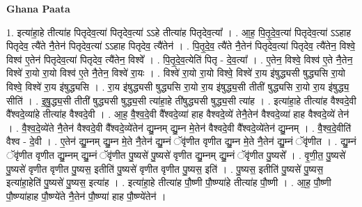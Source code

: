 \documentclass[17pt]{extarticle}
\begin{document}
\textbf{Ghana Paata } \newline

1. इत्या॑हा॒हे तीत्या॑ह पितृदेव॒त्या॑ पितृदेव॒त्या॑ ऽऽहे तीत्या॑ह पितृदेव॒त्या᳚ । . आ॒ह॒ पि॒तृ॒दे॒व॒त्या॑ पितृदेव॒त्या॑ ऽऽहाह पितृदेव॒ त्यै॑ते नै॒तेन॑ पितृदेव॒त्या॑ ऽऽहाह पितृदेव॒
त्यै॑तेन॑ । . पि॒तृ॒दे॒व॒ त्यै॑ते नै॒तेन॑ पितृदेव॒त्या॑ पितृदेव॒ त्यै॑तेन॒ विश्वे॒ विश्व॑ ए॒तेन॑ पितृदेव॒त्या॑ पितृदेव॒ त्यै॑तेन॒ विश्वे᳚ । . पि॒तृ॒दे॒व॒त्येति॑ पितृ - दे॒व॒त्या᳚ । . ए॒तेन॒ विश्वे॒ विश्व॑ ए॒ते नै॒तेन॒ विश्वे॑ रा॒यो रा॒यो विश्व॑ ए॒ते नै॒तेन॒ विश्वे॑ रा॒यः । . विश्वे॑ रा॒यो रा॒यो विश्वे॒ विश्वे॑ रा॒य इ॑षुद्ध्यसी षुद्ध्यसि रा॒यो विश्वे॒ विश्वे॑ रा॒य इ॑षुद्ध्यसि । . रा॒य इ॑षुद्ध्यसी षुद्ध्यसि रा॒यो रा॒य इ॑षुद्ध्य॒सी तीती॑ षुद्ध्यसि रा॒यो रा॒य इ॑षुद्ध्य॒ सीति॑ । . इ॒षु॒द्ध्य॒सी तीती॑ षुद्ध्यसी षुद्ध्य॒सी त्या॑हा॒हे ती॑षुद्ध्यसी षुद्ध्य॒सी त्या॑ह । . इत्या॑हा॒हे तीत्या॑ह वैश्वदे॒वी वै᳚श्वदे॒व्या॑हे तीत्या॑ह वैश्वदे॒वी । . आ॒ह॒ वै॒श्व॒दे॒वी वै᳚श्वदे॒व्या॑ हाह वैश्वदे॒व्ये॑ तेनै॒तेन॑ वैश्वदे॒व्या॑ हाह वैश्वदे॒व्ये॑ तेन॑ । . वै॒श्व॒दे॒व्ये॑ते नै॒तेन॑ वैश्वदे॒वी वै᳚श्वदे॒व्ये॑तेन॑ द्यु॒म्नम् द्यु॒म्न मे॒तेन॑ वैश्वदे॒वी वै᳚श्वदे॒व्ये॑तेन॑ द्यु॒म्नम् । . वै॒श्व॒दे॒वीति॑ वैश्व - दे॒वी । . ए॒तेन॑ द्यु॒म्नम् द्यु॒म्न मे॒ते नै॒तेन॑ द्यु॒म्नं ॅवृ॑णीत वृणीत द्यु॒म्न मे॒ते नै॒तेन॑ द्यु॒म्नं ॅवृ॑णीत । . द्यु॒म्नं ॅवृ॑णीत वृणीत द्यु॒म्नम् द्यु॒म्नं ॅवृ॑णीत पु॒ष्यसे॑ पु॒ष्यसे॑ वृणीत द्यु॒म्नम् द्यु॒म्नं ॅवृ॑णीत पु॒ष्यसे᳚ । . वृ॒णी॒त॒ पु॒ष्यसे॑ पु॒ष्यसे॑ वृणीत वृणीत पु॒ष्यस॒ इतीति॑ पु॒ष्यसे॑ वृणीत वृणीत पु॒ष्यस॒ इति॑ । . पु॒ष्यस॒ इतीति॑ पु॒ष्यसे॑ पु॒ष्यस॒ इत्या॑हा॒हेति॑ पु॒ष्यसे॑ पु॒ष्यस॒ इत्या॑ह । . इत्या॑हा॒हे तीत्या॑ह पौ॒ष्णी पौ॒ष्ण्या॑हे तीत्या॑ह पौ॒ष्णी । . आ॒ह॒ पौ॒ष्णी पौ॒ष्ण्या॑हाह पौ॒ष्ण्ये॑ते नै॒तेन॑ पौ॒ष्ण्या॑ हाह पौ॒ष्ण्ये॑तेन॑ । \newline
\end{document}
